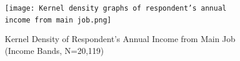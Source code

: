 \documentclass[serif, aspectratio=169]{beamer}
\begin{document}
\begin{frame}[label=income_band]
\begin{columns}[T]
\begin{column}{0.7\textwidth}
\begin{table}
\begin{tabular}{lcccccccccccccc}
                    \bottomrule
                \end{tabular}
            \end{table}
            \vspace{-0.63cm}
            \begin{figure}
                \texttt{[image: Kernel density graphs of respondent’s annual income from main job.png]}
                \vspace{-0.15cm}
                \captionsetup{font=tiny}
                \caption{Kernel Density of Respondent's Annual Income from Main Job (Income Bands, N=20,119)}
                \label{fig:Kernel_density}
            \end{figure}
        \end{column}
        \begin{column}{0.3\textwidth}
    \vspace{3.0cm}
    \hspace{-1.1cm}
\end{column}
    \end{columns}
\end{frame}
\end{document}
